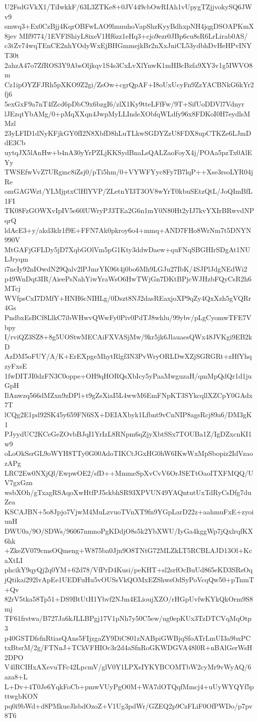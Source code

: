 U2FsdGVkX1/TiIwkkF/63L3ZTKe8+0JV449cbOwRIAh1vUpygTZjjvokySQ6JWv9
smwq3+Ex0CzBjj4KqrOBFwLAO9lmuuhoVapShzKyyBdhxpNH4jqgDSOAPKmX8jev
MIf9774/1EVFlShiyL8ixeV1Hf6zz1eHq3+cjo9ezr0JBp6cu8sR6LrLirab0AS/
c3tZv74wqTEnCE2nhYOdyWxEjBHGmmejkBr2nXxJniCL53ydbhDvHeHPvINYT30t
2ahzA47o7ZfROS3Y9AbsOljkqv1S4s3CxLvXlYnwK1mHBcBzfa9XY3v1g5IWVO8m
Cz1ipOYZFJRh5pXKO9Z2gi/ZsOw+cgrQpAF+I8oUxUcyFn9ZzYACBNkG6kYr2fj6
5exGxF9a7nT4fZcd6pDbC9x6bzgI6/zlX1Ky9tteLFfFw/9T+SifUoDDVl7Vdnyr
lJEzqtYbAMg/0+pMqXXqn4JwpMyLLIndeXObfqWLdfy96x8FDKoI0H7eydlsMMzl
23yLFID1dNyKFjkGY0fI2N8XbfD8hLuTLkwSGDYZzU8FDX8upCTKZe6LJmDdE3Cb
uytqJX5lAnHw+b4nA30yYrPZLjKKSydBnaLsQALZaoFoyX4j/POAa5pzTx0AlEYy
TWSEfwVvZ7URgmc8iZsj0/pTi5hm/0+VYWFYyc8Fy7B7lqP++Xse3rsoLYR04jRe
omGAGWzt/YLMjptxClHlYVP/ZLetnYI3T3OV8wYrT0kbuSEtzQtL/JoQImBfL1FI
TK08FzGOWXvIpIV5e60lUWryPJ3TEa2G6n1mY0N80Ht2yIJ7kvYXIrBRwvdNPqrQ
ldAcE3+y/akd3klr1f9E+FFN7Ak0pkroy6o4+mmq+AND7FHo8WrNm7t5DNYN990V
MtGAFjGFLDy5jD7XqbGOlVm5pG1Kty3ddwDaew+quFNqSBGHIrSDgAt1NULJryqm
i7ncIy92nIOwdN29Qalv2lPJmrYK96t4j0bo6Mh9LGJu27IbK/4SJPlJdgNEdWi2
p49WnDqt3IR/AieePsNahYiwYraWsO6HwTWjGn7DKtBPjcWJHzbFQyCsR2h6MTcj
WVfpsCxI7DMfY+HNH6cNIHLg/0Dszt8NJ2dasREaxjoXP9qZy4QxXzh5gVQRr4Gs
PndbxEsBCf8LlkC7ibWHwvQWwFy0Piv0PdTJ8whlu/99ybv/pLgCyomwTFE7Vbpy
I/rviQZ3SZ8+8g5UOStwMECAiFXVASjMw/9kr5jk6JlauaesQWx48JVKgi9EB2kD
AzDM5oFUY/A/K+ErEXpgeMhytRlgf3N3PvWryORLDwXZjSGRGRt+zHfYhqzyFxsE
1fwDITJI0dzFN3C0oppe+OH9qHORQsXbIcy5yPaaMwguzaH/qmMpQdQr1d1juGpH
IlAnwzq566dMZxn9zDPl+t9gZsXiaI5L4wwM6EmFNpKT3SYkcqllXZCpY0GAdx7T
lCQg2E1pd92SK45y659FN6SX+DEIAXbyk1Lfbnt9vCnNIP8agsRcj89a6/DM3gK1
PJyydUC2KCeGeZOvbBJqI1YrIzL8RNpm6qZjyXbtSSx7TOUBa1Z/IgDZxcnKI1w9
oLoOkSsrGL9oWYH8TTy0G00AdoTIKCtJGxHG0hW6IKwWxMpSbopiz2IdVzaozAPg
LRC2Ew0NXjQl/EwpwOE2/sfD++MmmeSpXvCvV6OrJSETtOaoITXFMQQ/UV7gxGzn
wsbXOh/gTxagRSAqoXwHtfPJ5ckbhSR93XPVUN49YAQntutUxTdRyCsDfg7duZea
KSCAJBN+5o8Jpjo7VjwM4MuLzvuoTVnXT9fn9YGpLarD22z+aahmuFxE+zyoiunH
DWU0a/9O/SDWs/96067nmnoPgKDdjO8s5k2YbXWU/IyGa4kggWp7jQxlrqfKX6hk
+ZkeZV079cmsOQmeng+W875ba0Jjn9O8TNtG72MLZkLT5RCBLAJD13Ol+KcaXtLI
phcikY9qyQj2q0YM+62d78/VfPrD4Kusi/peKHT+sl2srfOcBuUd865eKD3SRsOq
jQtikai292lvApEe1UEDFuHu5vOUSsVkQOMxEZShwsOdSyPoVcqQw50+pTnmT+Qv
82rV5tka58Tp51+DS9BtUtH1Ybvf2NJm4ELioujXZO/rHGpUvfwKYkQkOrm9S8mj
TF61frstwa/B727Ja6kJLLBPgj17V1pNh7y50C5ew/ug0epKUx3TzDTCVqMqOtp3
p40GSTDfsfnRtiasQAns5FIjzgaZY9DiC801zNABpiGWBjqSfoATrLmUI3a9bxPC
txBtsrM/2g/FTNnJ+TCkVFHIOc3r2d4aSfnRoGKWDGVA48l0R+nBAlGerWsH2DPO
V4lRCIHxAXevuTFc42LpcmV/glV0Y1LPXsIYKYBCOMTbW2cyMr9vWyAQ/6aza8+L
L+Dv+4T0Je6YqkFoCb+pmwVUyPgO0M+WA7dOTQqfMmcj4+uUyWYQYf5pttwgbKON
pq0i9bWd+d8PMkueJlsbdOzoZ+V1Ug3pdWr/GZEQ2p9CzFLiF0OfPWDo/p7pv8T6
